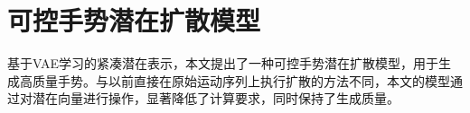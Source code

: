 \section{可控手势潜在扩散模型}
\label{sec:method:gld}
基于VAE学习的紧凑潜在表示，本文提出了一种可控手势潜在扩散模型，用于生成高质量手势。与以前直接在原始运动序列上执行扩散的方法不同，本文的模型通过对潜在向量进行操作，显著降低了计算要求，同时保持了生成质量。

